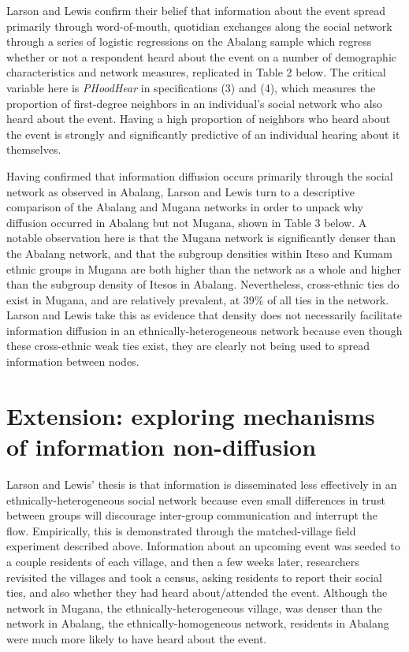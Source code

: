 \documentclass[]{article}
\begin{document}
Larson and Lewis confirm their belief that information about the event spread primarily through word-of-mouth, quotidian exchanges along the social network through a series of logistic regressions on the Abalang sample which regress whether or not a respondent heard about the event on a number of demographic characteristics and network measures, replicated in Table 2 below. The critical variable here is \textit{PHoodHear} in specifications (3) and (4), which measures the proportion of first-degree neighbors in an individual's social network who also heard about the event. Having a high proportion of neighbors who heard about the event is strongly and significantly predictive of an individual hearing about it themselves.




Having confirmed that information diffusion occurs primarily through the social network as observed in Abalang, Larson and Lewis turn to a descriptive comparison of the Abalang and Mugana networks in order to unpack why diffusion occurred in Abalang but not Mugana, shown in Table 3 below. A notable observation here is that the Mugana network is significantly denser than the Abalang network, and that the subgroup densities within Iteso and Kumam ethnic groups in Mugana are both higher than the network as a whole and higher than the subgroup density of Itesos in Abalang. Nevertheless, cross-ethnic ties do exist in Mugana, and are relatively prevalent, at 39\% of all ties in the network.  Larson and Lewis take this as evidence that density does not necessarily facilitate information diffusion in an ethnically-heterogeneous network because even though these cross-ethnic weak ties exist, they are clearly not being used to spread information between nodes.



\section{Extension: exploring mechanisms of information non-diffusion}

Larson and Lewis' thesis is that information is disseminated less effectively in an ethnically-heterogeneous social network because even small differences in trust between groups will discourage inter-group communication and interrupt the flow. Empirically, this is demonstrated through the matched-village field experiment described above. Information about an upcoming event was seeded to a couple residents of each village, and then a few weeks later, researchers revisited the villages and took a census, asking residents to report their social ties, and also whether they had heard about/attended the event. Although the network in Mugana, the ethnically-heterogeneous village, was denser than the network in Abalang, the ethnically-homogeneous network, residents in Abalang were much more likely to have heard about the event.
\end{document}

